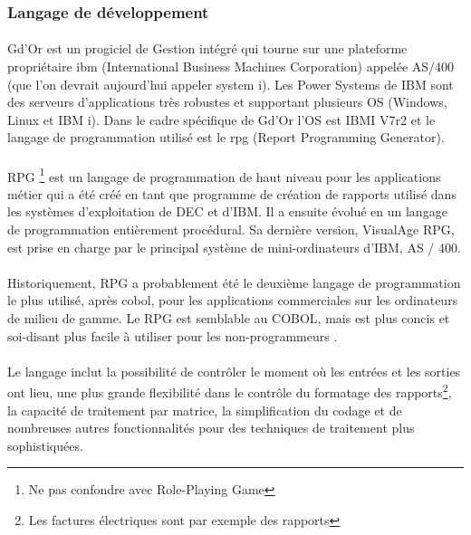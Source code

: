       \subsubsection{Langage de d\'eveloppement}
	\paragraph{}
	Gd'Or est un progiciel de Gestion intégré qui tourne sur une plateforme propriétaire \gls{ibm} (International Business Machines Corporation) appelée AS/400 (que l’on devrait aujourd’hui appeler system i). Les Power Systems de IBM sont des serveurs d’applications très robustes et supportant plusieurs OS (Windows, Linux et IBM i). Dans le cadre spécifique de Gd'Or l'OS est IBMI V7r2 et le langage de programmation utilisé est le \gls{rpg} (Report Programming Generator).
	\paragraph{}
	RPG \footnote{Ne pas confondre avec Role-Playing Game} est un langage de programmation de haut niveau pour les applications métier qui a été créé en tant que programme de création de rapports utilisé dans les systèmes d’exploitation de DEC et d’IBM. Il a ensuite évolué en un langage de programmation entièrement procédural. Sa dernière version, VisualAge RPG, est prise en charge par le principal système de mini-ordinateurs d’IBM, AS / 400.
	\paragraph{}
	Historiquement, RPG a probablement été le deuxième langage de programmation le plus utilisé, après \gls{cobol}, pour les applications commerciales sur les ordinateurs de milieu de gamme. Le RPG est semblable au COBOL, mais est plus concis et soi-disant plus facile à utiliser pour les non-programmeurs \cite{rpg}.
	\paragraph{}
	Le langage inclut la possibilité de contrôler le moment où les entrées et les sorties ont lieu, une plus grande flexibilité dans le contrôle du formatage des rapports\footnote{Les factures \'electriques sont par exemple des rapports}, la capacité de traitement par matrice, la simplification du codage et de nombreuses autres fonctionnalités pour des techniques de traitement plus sophistiquées.
	  
